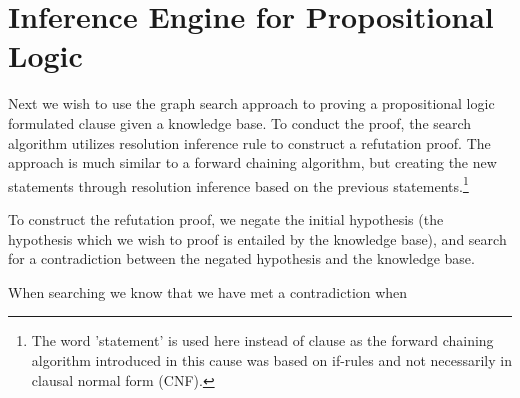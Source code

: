 \section{Inference Engine for Propositional Logic}

Next we wish to use the graph search approach to proving a propositional logic formulated clause given a knowledge base. To conduct the proof, the search algorithm utilizes resolution inference rule to construct a refutation proof. The approach is much similar to a forward chaining algorithm, but creating the new statements through resolution inference based on the previous statements.\footnote{The word 'statement' is used here instead of clause as the forward chaining algorithm introduced in this cause was based on if-rules and not necessarily in clausal normal form (CNF).}

To construct the refutation proof, we negate the initial hypothesis (the hypothesis which we wish to proof is entailed by the knowledge base), and search for a contradiction between the negated hypothesis and the knowledge base.

When searching we know that we have met a contradiction when 